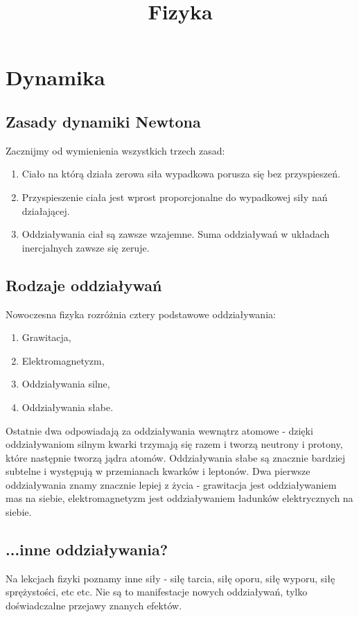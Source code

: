 \documentclass[11pt]{article}
\title{Fizyka}
\theoremstyle{definition}
\numberwithin{zad}{section}
\begin{document}
\maketitle
\tableofcontents

\section{Dynamika}
\subsection{Zasady dynamiki Newtona}

Zacznijmy od wymienienia wszystkich trzech zasad:

\begin{enumerate}
\item Ciało na którą działa zerowa siła wypadkowa porusza się bez przyspieszeń.
\item Przyspieszenie ciała jest wprost proporcjonalne do wypadkowej siły nań działającej.
\item Oddziaływania ciał są zawsze wzajemne. Suma oddziaływań w układach inercjalnych zawsze się zeruje.
\end{enumerate}

\subsection{Rodzaje oddziaływań}

Nowoczesna fizyka rozróżnia cztery podstawowe oddziaływania:

\begin{enumerate}
\item Grawitacja,
\item Elektromagnetyzm,
\item Oddziaływania silne,
\item Oddziaływania słabe.
\end{enumerate}

Ostatnie dwa odpowiadają za oddziaływania wewnątrz atomowe - dzięki oddziaływaniom silnym kwarki trzymają się razem i tworzą neutrony i protony, które następnie tworzą jądra atomów. Oddziaływania słabe są znacznie bardziej subtelne i występują w przemianach kwarków i leptonów. Dwa pierwsze oddziaływania znamy znacznie lepiej z życia - grawitacja jest oddziaływaniem mas na siebie, elektromagnetyzm jest oddziaływaniem ładunków elektrycznych na siebie.

\subsection{...inne oddziaływania?}

Na lekcjach fizyki poznamy inne siły - siłę tarcia, siłę oporu, siłę wyporu, siłę sprężystości, etc etc. Nie są to manifestacje nowych oddziaływań, tylko doświadczalne przejawy znanych efektów.
\end{document}
